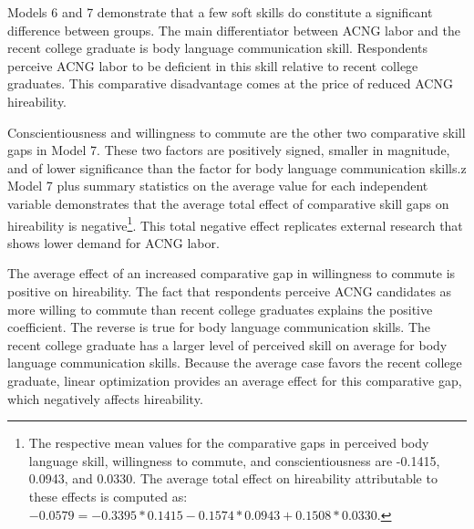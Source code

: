 \documentclass[review]{elsarticle}
\begin{document}
Models 6 and 7 demonstrate that a few soft skills do constitute a significant difference between groups.
The main differentiator between ACNG labor and the recent college graduate is body language communication skill.
Respondents perceive ACNG labor to be deficient in this skill relative to recent college graduates.
This comparative disadvantage comes at the price of reduced ACNG hireability.

Conscientiousness and willingness to commute are the other two comparative skill gaps in Model 7.
These two factors are positively signed, smaller in magnitude, and of lower significance than the factor for body language communication skills.z
Model 7 plus summary statistics on the average value for each independent variable demonstrates that
the average total effect of comparative skill gaps on hireability is negative\footnote{
    The respective mean values for the comparative gaps in perceived body language skill,
    willingness to commute,
    and conscientiousness
    are -0.1415, 0.0943, and 0.0330.
    The average total effect on hireability attributable to these effects is computed as:
    $-0.0579 = -0.3395*0.1415 - 0.1574*0.0943 + 0.1508*0.0330$.
}.
This total negative effect replicates external research that shows lower demand for ACNG labor.

The average effect of an increased comparative gap in willingness to commute is positive on hireability.
The fact that respondents perceive ACNG candidates as more willing to commute than recent college graduates explains the positive coefficient.
The reverse is true for body language communication skills.
The recent college graduate has a larger level of perceived skill on average for body language communication skills.
Because the average case favors the recent college graduate, linear optimization provides an average effect for this comparative gap, which negatively affects hireability.
\end{document}
